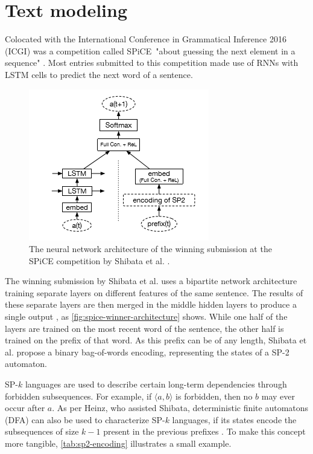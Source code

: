 \section{Text modeling}
Colocated with the International Conference in Grammatical Inference 2016 (ICGI) was a competition called SPiCE\ "about guessing the next element in a sequence" \cite{web:spice}. Most entries submitted to this competition made use of RNNs with LSTM cells to predict the next word of a sentence.

\begin{figure}
    \centering
    \includegraphics[height=.4\textwidth]{gfx/spice-winner-architecture.png}
    \caption{The neural network architecture of the winning submission at the SPiCE competition by Shibata et al. \cite{shibata2016bipartite}.}
    \label{fig:spice-winner-architecture}
\end{figure}

The winning submission by Shibata et al. uses a bipartite network architecture training separate layers on different features of the same sentence. The results of these separate layers are then merged in the middle hidden layers to produce a single output \cite{shibata2016bipartite}, as \autoref{fig:spice-winner-architecture} shows.
While one half of the layers are trained on the most recent word of the sentence, the other half is trained on the prefix of that word. As this prefix can be of any length, Shibata et al. propose a binary bag-of-words encoding, representing the states of a SP-2 automaton.

SP-$k$ languages are used to describe certain long-term dependencies through forbidden subsequences. For example, if $\langle a,b \rangle$ is forbidden, then no $b$ may ever occur after $a$. As per Heinz, who assisted Shibata, deterministic finite automatons (DFA) can also be used to characterize SP-$k$ languages, if its states encode the subsequences of size $k-1$  present in the previous prefixes \cite{heinz2010estimatingSP}. To make this concept more tangible, \autoref{tab:sp2-encoding} illustrates a small example.

